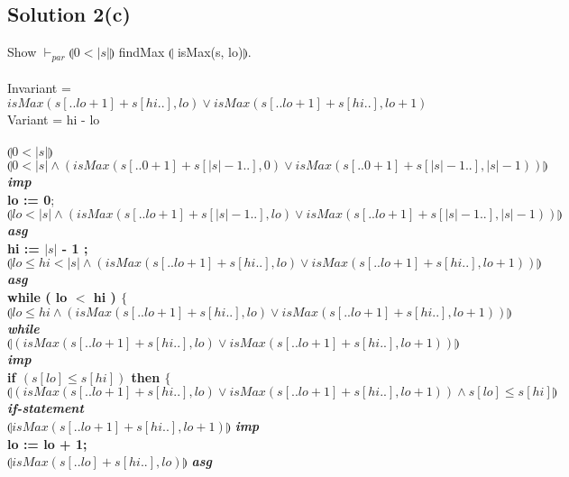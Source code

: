 \documentclass[12pt]{article}
\newcommand\abs[1]{\left|#1\right|}
\begin{document}
\subsection*{Solution 2(c)}
Show $\vdash_{par} \limg 0 < \abs{s} \rimg$ findMax $\limg $ isMax(s, lo)$\rimg$. \\ \\
Invariant = $isMax(s[..lo+1]+s[hi..],lo) \lor isMax(s[..lo+1]+s[hi..],lo+1) $\\
Variant = hi - lo \\ \\
$\limg 0 < \abs{s} \rimg$ \\
$\limg 0 < \abs{s} \land (isMax(s[..0+1]+s[\abs{s}-1..], 0) \lor isMax(s[..0+1]+s[\abs{s}-1..], \abs{s} - 1))\rimg$ \textit{\textbf{imp}}\\				
\textbf{lo := 0};  \\
$\limg lo < \abs{s} \land (isMax(s[..lo+1]+s[\abs{s}-1..], lo) \lor isMax(s[..lo+1]+s[\abs{s}-1..], \abs{s} - 1))\rimg$ \textit{\textbf{asg}}\\
\textbf{hi := $\abs{s}$ - 1 ;} \\
$\limg lo \leq hi < \abs{s} \land (isMax(s[..lo+1]+s[hi..], lo) \lor isMax(s[..lo+1]+s[hi..], lo+1))\rimg$	\textit{\textbf{asg}}\\
\textbf{while ( lo $<$ hi ) $\{$} \\
\hspace*{10mm}$\limg lo \leq hi \land (isMax(s[..lo+1]+s[hi..], lo) \lor isMax(s[..lo+1]+s[hi..], lo+1))\rimg$	\textit{\textbf{while}}\\
\hspace*{10mm}$\limg (isMax(s[..lo+1]+s[hi..], lo) \lor isMax(s[..lo+1]+s[hi..], lo+1))\rimg$	\textit{\textbf{imp}}\\
\hspace*{10mm}\textbf{if $(s[lo] \leq s[hi])$ then $\{$} \\
\hspace*{20mm}$\limg (isMax(s[..lo+1]+s[hi..], lo) \lor isMax(s[..lo+1]+s[hi..], lo+1)) \land s[lo] \leq s[hi]\rimg$	\\ \hspace*{20mm}\textit{\textbf{if-statement}}\\
\hspace*{20mm}$\limg isMax(s[..lo+1]+s[hi..], lo+1) \rimg$ \textit{\textbf{imp}}\\
\hspace*{20mm}\textbf{lo := lo + 1;} \\
\hspace*{20mm}$\limg isMax(s[..lo]+s[hi..], lo) \rimg$ \textit{\textbf{asg}}\\
\end{document}
